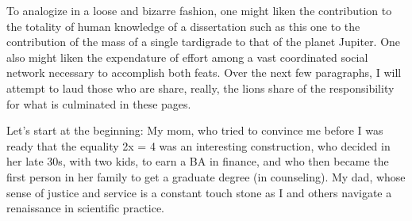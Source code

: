 To analogize in a loose and bizarre fashion, one might liken the contribution to the totality of human knowledge of a dissertation such as this one to the contribution of the mass of a single tardigrade to that of the planet Jupiter.
One also might liken the expendature of effort among a vast coordinated social network necessary to accomplish both feats.
Over the next few paragraphs, I will attempt to laud those who are share, really, the lions share of the responsibility for what is culminated in these pages.

Let's start at the beginning: 
My mom, who tried to convince me before I was ready that the equality 2x = 4 was an interesting construction, who decided in her late 30s, with two kids, to earn a BA in finance, and who then became the first person in her family to get a graduate degree (in counseling).
My dad, whose sense of justice and service is a constant touch stone as I and others navigate a renaissance in scientific practice.